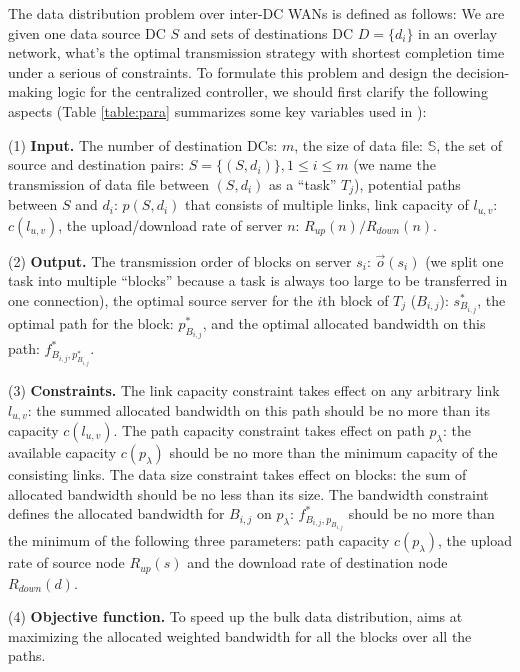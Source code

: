 The data distribution problem over inter-DC WANs is defined as follows: We are given one data source DC $S$ and sets of destinations DC $D=\{d_i\}$ in an overlay network, what's the optimal transmission strategy with shortest completion time under a serious of constraints. To formulate this problem and design the decision-making logic for the centralized controller, we should first clarify the following aspects (Table \ref{table:para} summarizes some key variables used in \name):

(1) \textbf{Input.} The number of destination DCs: $m$, the size of data file: $\mathbb{S}$, the set of source and destination pairs: $S=\{(S,d_i)\}, 1\leq i\leq m$ (we name the transmission of data file between $(S,d_i)$ as a ``task'' $T_j$), potential paths between $S$ and $d_i$: $p(S,d_i)$ that consists of multiple links, link capacity of $l_{u,v}$: $c(l_{u,v})$, the upload/download rate of server $n$: $R_{up}(n)/R_{down}(n)$.

(2) \textbf{Output.} The transmission order of blocks on server $s_i$: $\overrightarrow{o}(s_i)$ (we split one task into multiple ``blocks'' because a task is always too large to be transferred in one connection), the optimal source server for the $i$th block of $T_j$ ($B_{i,j}$): $s_{B_{i,j}}^*$, the optimal path for the block: $p_{B_{i,j}}^*$, and the optimal allocated bandwidth on this path: $f^*_{B_{i,j},p_{B_{i,j}}^*}$.

(3) \textbf{Constraints.} The link capacity constraint takes effect on any arbitrary link $l_{u,v}$: the summed allocated bandwidth on this path should be no more than its capacity $c(l_{u,v})$. The path capacity constraint takes effect on path $p_\lambda$: the available capacity $c(p_\lambda)$ should be no more than the minimum capacity of the consisting links. The data size constraint takes effect on blocks: the sum of allocated bandwidth should be no less than its size. The bandwidth constraint defines the allocated bandwidth for $B_{i,j}$ on $p_\lambda$: $f^*_{B_{i,j},p_{B_{i,j}}}$ should be no more than the minimum of the following three parameters: path capacity $c(p_\lambda)$, the upload rate of source node $R_{up}(s)$ and the download rate of destination node $R_{down}(d)$.

(4) \textbf{Objective function.} To speed up the bulk data distribution, \name aims at maximizing the allocated weighted bandwidth for all the blocks over all the paths.

